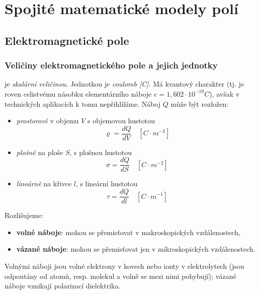 \graphicspath{{../src/TEO/img/}}
\setchaptertoc
\chapter{Spojité matematické modely polí}

  \section{Elektromagnetické pole}
    \subsection{Veličiny elektromagnetického pole a jejich jednotky}
       je \emph{skalární veličinou}. Jednotkou je \emph{coulomb [C]}. Má
         kvantový charakter (tj. je roven celistvému násobku elementárního náboje $e =
         1,602\cdot10^{-19}C$), avšak v technických aplikacích k tomu nepřihlížíme. Náboj $Q$
         může být rozložen:
         \begin{itemize}[noitemsep]
            \item \emph{prostorově} v objemu $V$ s objemovou hustotou
               \begin{equation}\label{TEMP:eq_q_varrho}
                  \varrho = \frac{dQ}{dV} \quad [C\cdot m^{-3}]
               \end{equation}               
            \item \emph{plošně} na ploše $S$, s plošnou hustotou
               \begin{equation}\label{TEMP:eq_q_sigma}
                  \sigma = \frac{dQ}{dS} \quad [C\cdot m^{-2}]
               \end{equation}                 
            \item \emph{lineárně} na křivce $l$, s lineární hustotou
               \begin{equation}\label{TEMP:eq_q_tau}
                  \tau = \frac{dQ}{dl} \quad [C\cdot m^{-1}]
               \end{equation}                 
         \end{itemize}
         Rozlišujeme:
           \begin{itemize}[noitemsep]
             \item \textbf{volné náboje}: mohou se přemisťovat v makroskopických
             vzdálenostech,
             \item \textbf{vázané náboje}: mohou se přemisťovat jen v
             mikroskopických vzdálenostech.
           \end{itemize}
         Volnými náboji jsou volné elektrony v kovech nebo ionty v elektrolytech (jsou odpoutány od
         atomů, resp. molekul a volně se mezi nimi pohybují); vázané náboje vznikají polarizací
         dielektrika.
         
